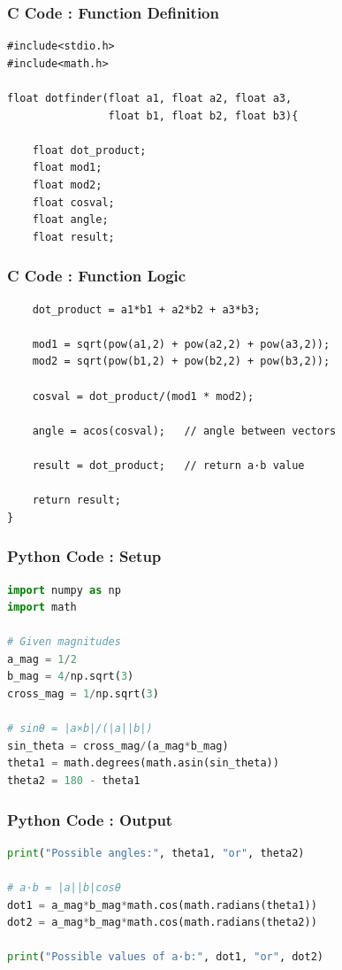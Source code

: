 \documentclass{beamer}
\begin{document}
\begin{frame}[fragile]
\frametitle{C Code : Function Definition}
\begin{lstlisting}
#include<stdio.h>
#include<math.h>

float dotfinder(float a1, float a2, float a3, 
                float b1, float b2, float b3){

    float dot_product;
    float mod1;
    float mod2;
    float cosval;
    float angle;
    float result;
\end{lstlisting}
\end{frame}

\begin{frame}[fragile]
\frametitle{C Code : Function Logic}
\begin{lstlisting}
    dot_product = a1*b1 + a2*b2 + a3*b3;

    mod1 = sqrt(pow(a1,2) + pow(a2,2) + pow(a3,2));
    mod2 = sqrt(pow(b1,2) + pow(b2,2) + pow(b3,2));

    cosval = dot_product/(mod1 * mod2);

    angle = acos(cosval);   // angle between vectors

    result = dot_product;   // return a·b value

    return result;
}
\end{lstlisting}
\end{frame}

\begin{frame}[fragile]
\frametitle{Python Code : Setup}
\begin{lstlisting}[language=Python]
import numpy as np
import math

# Given magnitudes
a_mag = 1/2
b_mag = 4/np.sqrt(3)
cross_mag = 1/np.sqrt(3)

# sinθ = |a×b|/(|a||b|)
sin_theta = cross_mag/(a_mag*b_mag)
theta1 = math.degrees(math.asin(sin_theta))
theta2 = 180 - theta1
\end{lstlisting}
\end{frame}

\begin{frame}[fragile]
\frametitle{Python Code : Output}
\begin{lstlisting}[language=Python]
print("Possible angles:", theta1, "or", theta2)

# a·b = |a||b|cosθ
dot1 = a_mag*b_mag*math.cos(math.radians(theta1))
dot2 = a_mag*b_mag*math.cos(math.radians(theta2))

print("Possible values of a·b:", dot1, "or", dot2)
\end{lstlisting}
\end{frame}
\end{document}
